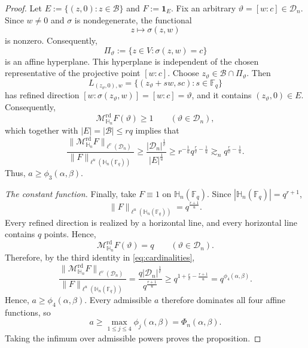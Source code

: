 \documentclass[10pt,a4paper]{amsart}
\newcommand{\Dn}{\mathcal D_n}
\newcommand{\Fq}{\mathbb F_q}
\newcommand{\HH}{\mathbb H}
\newcommand{\Mrd}{\mathcal M^{\mathrm{rd}}_{\HH_n}}
\newcommand{\norm}[1]{\lVert #1\rVert}
\newcommand{\one}{\mathbf 1}
\begin{document}
\begin{proof}
Let $E:=\{(z,0): z\in\mathcal B\}$ and $F:=\one_E$. 
Fix an arbitrary $\vartheta=[w:c]\in\Dn$. Since
$w\neq0$ and $\sigma$ is nondegenerate, the functional
\[
 z\longmapsto\sigma(z,w)
\]
is nonzero. Consequently,
\[
 \Pi_\vartheta
 :=\{z\in V:\sigma(z, w)=c\}
\]
is an affine hyperplane. This hyperplane is independent of the chosen representative of the projective point $[w:c]$. Choose $z_\vartheta\in\mathcal B\cap\Pi_\vartheta$. Then
\begin{equation}\label{eq:witnessing-line-final}
 L_{(z_\vartheta,0), w}
 =
 \{(z_\vartheta+sw,sc):s\in\Fq\}
\end{equation}
has refined direction $
 [w:\sigma(z_\vartheta,w)]
 =[w:c]
 =\vartheta$, 
and it contains $(z_\vartheta,0)\in E$. Consequently,
\[
 \Mrd F(\vartheta)\geq1
 \qquad(\vartheta\in\Dn),
\]
which together with $|E|=|\mathcal{B}| \leq r q$ implies that
\[
 \frac{\norm{\Mrd F}_{\ell^v(\Dn)}}
      {\norm{F}_{\ell^u(\HH_n(\Fq))}}
      \geq
 \frac{|\Dn|^{\frac{1}{v}}}{|E|^{\frac{1}{u}}}
 \geq
 r^{-\frac{1}{u}}q^{\frac{r}{v}-\frac{1}{u}}
 \gtrsim_n q^{\frac{r}{v}-\frac{1}{u}}.
\]
Thus, $a\geq\phi_3(\alpha,\beta)$.


\emph{The constant function.}
Finally, take $F\equiv1$ on $\HH_n(\Fq)$. Since
$|\HH_n(\Fq)|=q^{r+1}$,
\[
 \norm{F}_{\ell^u(\HH_n(\Fq))}
 =q^{\frac{r+1}{u}}.
\]
Every refined direction is realized by a horizontal line, and every
horizontal line contains $q$ points. Hence,
\[
 \Mrd F(\vartheta)=q
 \qquad(\vartheta\in\Dn).
\]
Therefore, by the third identity in \eqref{eq:cardinalities},
\[
 \frac{\norm{\Mrd F}_{\ell^v(\Dn)}}
      {\norm{F}_{\ell^u(\HH_n(\Fq))}}
 =
 \frac{q|\Dn|^{\frac{1}{v}}}{q^{\frac{r+1}{u}}}
 \geq
 q^{1+\frac{r}{v}-\frac{r+1}{u}}
 =
 q^{\phi_4(\alpha,\beta)}.
\]
Hence, $a\geq\phi_4(\alpha,\beta)$. Every admissible $a$ therefore
dominates all four affine functions, so
\[
 a\geq\max_{1\leq j\leq4}\phi_j(\alpha,\beta)
 =\Phi_n(\alpha,\beta).
\]
Taking the infimum over admissible powers proves the proposition.
\end{proof}
\end{document}
